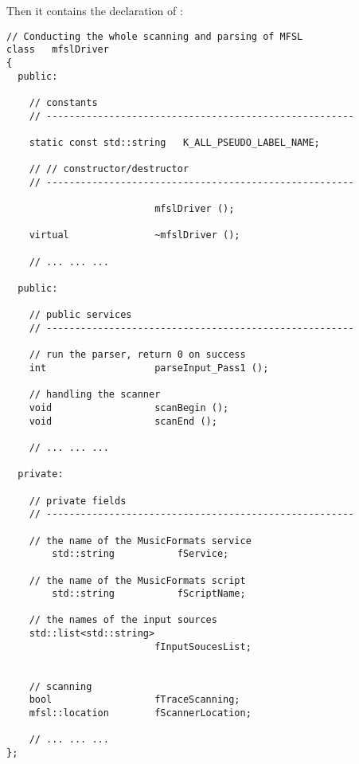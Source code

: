 Then it contains the declaration of :
\begin{lstlisting}[language=CPlusPlus]
// Conducting the whole scanning and parsing of MFSL
class   mfslDriver
{
  public:

    // constants
    // ------------------------------------------------------

    static const std::string   K_ALL_PSEUDO_LABEL_NAME;

    // // constructor/destructor
    // ------------------------------------------------------

                          mfslDriver ();

    virtual               ~mfslDriver ();

	// ... ... ...

  public:

    // public services
    // ------------------------------------------------------

    // run the parser, return 0 on success
    int                   parseInput_Pass1 ();

    // handling the scanner
    void                  scanBegin ();
    void                  scanEnd ();

	// ... ... ...

  private:

    // private fields
    // ------------------------------------------------------

    // the name of the MusicFormats service
		std::string           fService;

    // the name of the MusicFormats script
		std::string           fScriptName;

    // the names of the input sources
    std::list<std::string>
                          fInputSoucesList;


    // scanning
    bool                  fTraceScanning;
    mfsl::location        fScannerLocation;

	// ... ... ...
};
\end{lstlisting}

